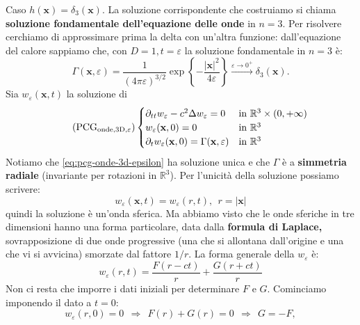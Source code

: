 \documentclass[10pt,a4paper,twoside,openright]{book}
\newcommand{\x}{\mathbf{x}}
\begin{document}
Caso $\displaystyle h(\x) =\delta _{3}(\x)$. La soluzione corrispondente che costruiamo si chiama \textbf{soluzione fondamentale dell'equazione delle onde} in $n=3$. Per risolvere cerchiamo di approssimare prima la delta con un'altra funzione: dall'equazione del calore sappiamo che, con $\displaystyle D=1,t=\varepsilon $ la soluzione fondamentale in $n=3$ è:
\begin{equation*}
	\Gamma (\x ,\varepsilon) =\frac{1}{(4\pi \varepsilon)^{3/2}}\exp\left\{-\frac{| \x| ^{2}}{4\varepsilon }\right\}\xrightarrow{\varepsilon \rightarrow 0^{+}} \delta _{3}(\x) .
\end{equation*}
Sia $\displaystyle w_{\varepsilon }(\x ,t)$ la soluzione di
\begin{equation*}
	\tag{PCG$_{\text{onde,3D},\varepsilon}$}
	\begin{cases}
		\partial _{tt} w_{\varepsilon } -c^{2} \Delta w_{\varepsilon } =0                & \text{in} \ \mathbb{R}^{3} \times (0,+\infty) \\
		w_{\varepsilon }(\x ,0) =0                                               & \text{in} \ \mathbb{R}^{3}                      \\
		\partial _{t} w_{\varepsilon }(\x ,0) =\Gamma (\x ,\varepsilon) & \text{in} \ \mathbb{R}^{3}                      
	\end{cases}
	\label{eq:pcg-onde-3d-epsilon}
\end{equation*}
Notiamo che \eqref{eq:pcg-onde-3d-epsilon} ha soluzione unica e che $\displaystyle \Gamma $ è a \textbf{simmetria radiale} (invariante per rotazioni in $\displaystyle \mathbb{R}^{3}$). Per l'unicità della soluzione possiamo scrivere:
\begin{equation*}
	w_{\varepsilon }(\x ,t) =w_{\varepsilon }(r,t) ,\ \ r=| \x| 
\end{equation*}
quindi la soluzione è un'onda sferica. Ma abbiamo visto che le onde sferiche in tre dimensioni hanno una forma particolare, data dalla \textbf{formula di Laplace, }sovrapposizione di due onde progressive (una che si allontana dall'origine e una che vi si avvicina) smorzate dal fattore $1/r$. La forma generale della $\displaystyle w_{\varepsilon }$ è:
\begin{equation*}
	w_{\varepsilon }(r,t) =\frac{F(r-ct)}{r} +\frac{G(r+ct)}{r}
\end{equation*}
Non ci resta che imporre i dati iniziali per determinare $F$ e $G$. Cominciamo imponendo il dato a $t=0$:
\begin{equation*}
	w_{\varepsilon }(r,0) =0\ \ \Rightarrow \ \ F(r) +G(r) =0\ \ \Rightarrow \ \ G=-F,
\end{equation*}
\end{document}
